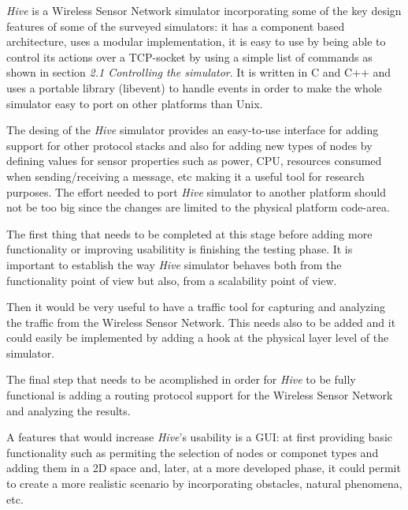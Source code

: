 \textit{Hive} is a Wireless Sensor Network simulator incorporating some of the
key design features of some of the surveyed simulators: it has a component
based architecture, uses a modular implementation, it is easy to use by being
able to control its actions over a TCP-socket by using a simple list of
commands as shown in section \textit{2.1 Controlling the simulator}.
It is written in C and C++ and uses a portable library (libevent) to handle
events in order to make the whole simulator easy to port on other platforms
than Unix.

The desing of the \textit{Hive} simulator provides an easy-to-use interface
for adding support for other protocol stacks and also for adding new types of
nodes by defining values for sensor properties such as power, CPU, resources
consumed when sending/receiving a message, etc making it a useful tool for
research purposes.
The effort needed to port \textit{Hive} simulator to another platform should
not be too big since the changes are limited to the physical platform
code-area.

The first thing that needs to be completed at this stage before adding more
functionality or improving usabilitity is finishing the testing phase. It is
important to establish the way \textit{Hive} simulator behaves both from the
functionality point of view but also, from a scalability point of view.

Then it would be very useful to have a traffic tool for capturing and
analyzing the traffic from the Wireless Sensor Network. This needs also to be
added and it could easily be implemented by adding a hook at
the physical layer level of the simulator.

The final step that needs to be acomplished in order for \textit{Hive} to be fully
functional is adding a routing protocol support for the Wireless Sensor
Network and analyzing the results.

A features that would increase \textit{Hive}'s usability is a GUI: at first
providing basic functionality such as permiting the selection of nodes
or componet types and adding them in a 2D space and, later, at a more developed phase, it could
permit to create a more realistic scenario by incorporating obstacles, natural
phenomena, etc.
